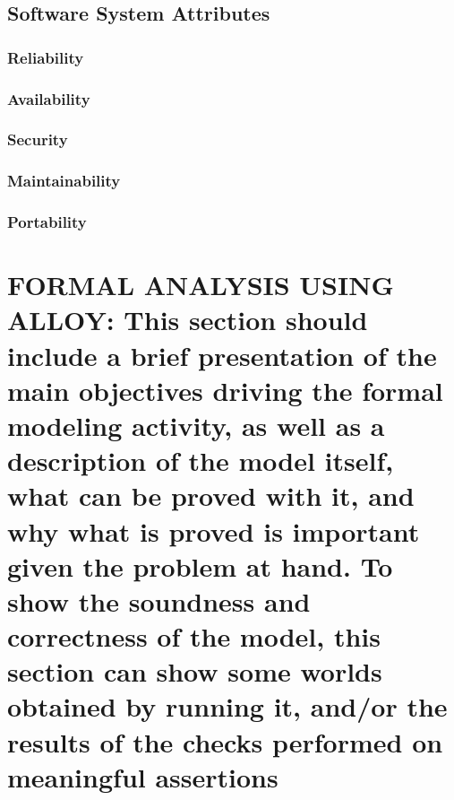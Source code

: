 \documentclass[12pt,a4paper]{article}
\begin{document}
\subsection{Software System Attributes} 
\subsubsection{Reliability}
\subsubsection{Availability}
\subsubsection{Security}
\subsubsection{Maintainability}
\subsubsection{Portability}
\section{FORMAL ANALYSIS USING ALLOY: This section should include a brief presentation of the 
main objectives driving the formal modeling activity, as well as a description of the model 
itself, what can be proved with it, and why what is proved is important given the problem at 
hand. To show  the soundness and correctness of the model,  this section can show some
worlds obtained by running it, and/or the results of the checks performed on meaningful 
assertions}
\end{document}
